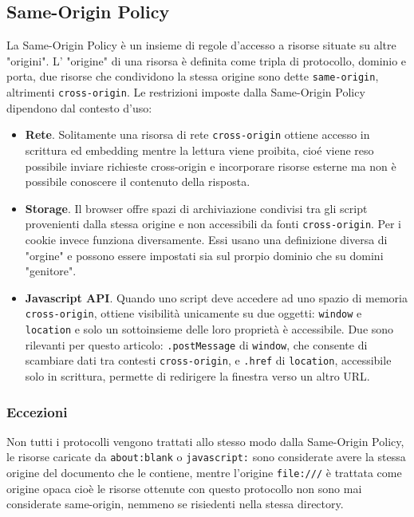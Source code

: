 \documentclass{sapthesis}
\newcommand{\code}[1]{\texttt{#1}}
\begin{document}
        \subsection{Same-Origin Policy}
        \label{sec:sicurezza-script-same-origin-policy}
            La Same-Origin Policy è un insieme di regole d'accesso a risorse situate su altre "origini".
            L' "origine" di una risorsa è definita come tripla di protocollo, dominio e porta, due risorse
            che condividono la stessa origine sono dette \code{same-origin}, altrimenti \code{cross-origin}.
            Le restrizioni imposte dalla Same-Origin Policy dipendono dal contesto d'uso:
            \begin{itemize}
                \item \textbf{Rete}. Solitamente una risorsa di rete \code{cross-origin} ottiene accesso in
                    scrittura ed embedding mentre la lettura viene proibita, cioé viene reso possibile
                    inviare richieste cross-origin e incorporare risorse esterne ma non è possibile
                    conoscere il contenuto della risposta.

                \item \textbf{Storage}. Il browser offre spazi di archiviazione condivisi tra gli script
                    provenienti dalla stessa origine e non accessibili da fonti \code{cross-origin}.
                    Per i cookie invece funziona diversamente. Essi usano una definizione diversa di 
                    "orgine" e possono essere impostati sia sul prorpio dominio che su domini "genitore".

                \item \textbf{Javascript API}. Quando uno script deve accedere ad uno spazio di
                    memoria \code{cross-origin}, ottiene visibilità unicamente su due oggetti: \code{window}
                    e \code{location} e solo un sottoinsieme delle loro proprietà è accessibile. Due sono
                    rilevanti per questo articolo: \code{.postMessage} di \code{window}, che consente di 
                    scambiare dati tra contesti \code{cross-origin}, e \code{.href} di \code{location}, 
                    accessibile solo in scrittura, permette di redirigere la finestra verso un altro URL.
            \end{itemize}

            \subsubsection{Eccezioni}
                Non tutti i protocolli vengono trattati allo stesso modo dalla Same-Origin Policy, le risorse
                caricate da \code{about:blank} o \code{javascript:} sono considerate avere la stessa origine del
                documento che le contiene, mentre l'origine \code{file:///} è trattata come origine opaca cioè
                le risorse ottenute con questo protocollo non sono mai considerate same-origin, nemmeno se
                risiedenti nella stessa directory.
\end{document}
